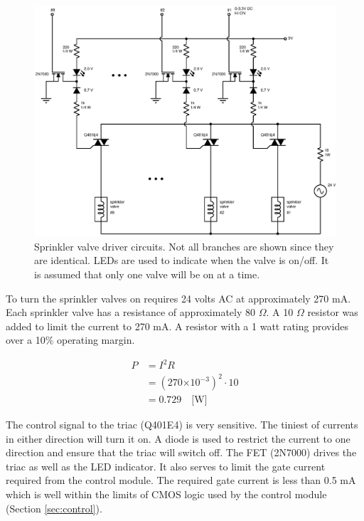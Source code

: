 \documentclass{article}
\providecommand{\e}[1]{\ensuremath{\times 10^{#1}}}
\begin{document}
\begin{figure}[hbp]
\centering
\includegraphics[scale=0.7]{xcircuit/driver_mult}
\caption{Sprinkler valve driver circuits.
Not all branches are shown since they are identical.
LEDs are used to indicate when the valve is on/off.
It is assumed that only one valve will be on at a time.}\label{fig:driver}
\end{figure}

To turn the sprinkler valves on requires 24 volts AC at approximately 270 mA.
Each sprinkler valve has a resistance of approximately 80 $\Omega$.
A 10 $\Omega$ resistor was added to limit the current to 270 mA.
A resistor with a 1 watt rating provides over a 10\% operating margin.

\begin{align*}
	P &= I^2 R \\
	  &= (270\e{-3})^2 \cdot 10 \\
	  &= 0.729 \quad \text{[W]}
\end{align*}

The control signal to the triac (Q401E4) is very sensitive.
The tiniest of currents in either direction will turn it on.
A diode is used to restrict the current to one direction and ensure
that the triac will switch off.
The FET (2N7000) drives the triac as well as the LED indicator.
It also serves to limit the gate current required from the control module.
The required gate current is less than 0.5 mA which is well within
the limits of CMOS logic used by the control module (Section \ref{sec:control}).

\end{document}
